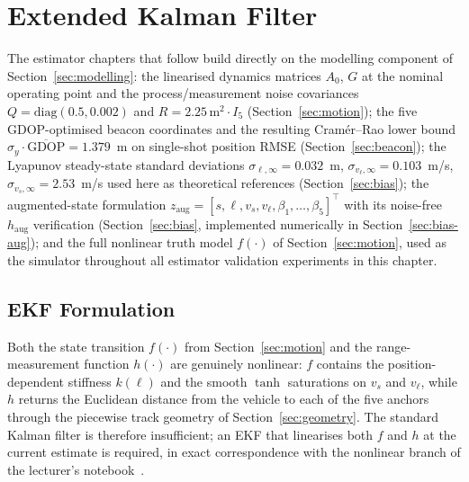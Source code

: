 \documentclass[11pt,a4paper]{article}
\begin{document}
\FloatBarrier
\section{Extended Kalman Filter}
\label{sec:ekf}

The estimator chapters that follow build directly on the modelling
component of Section~\ref{sec:modelling}: the linearised dynamics
matrices $A_0$, $G$ at the nominal operating point and the
process/measurement noise covariances $Q=\mathrm{diag}(0.5, 0.002)$
and $R=2.25\,\mathrm{m}^2 \cdot I_5$ (Section~\ref{sec:motion}); the
five GDOP-optimised beacon coordinates and the resulting
Cram\'er--Rao lower bound
$\sigma_y\cdot\overline{\mathrm{GDOP}}=1.379$~m on single-shot
position RMSE (Section~\ref{sec:beacon}); the Lyapunov steady-state
standard deviations $\sigma_{\ell,\infty}=0.032$~m,
$\sigma_{v_\ell,\infty}=0.103$~m/s, $\sigma_{v_s,\infty}=2.53$~m/s
used here as theoretical references (Section~\ref{sec:bias}); the
augmented-state formulation
$z_\text{aug}=[s,\ell,v_s,v_\ell,\beta_1,\dots,\beta_5]^{\!\top}$ with its
noise-free $h_\text{aug}$ verification (Section~\ref{sec:bias},
implemented numerically in Section~\ref{sec:bias-aug}); and the
full nonlinear truth model $f(\cdot)$ of Section~\ref{sec:motion},
used as the simulator throughout all estimator validation
experiments in this chapter.

\subsection{EKF Formulation}
\label{sec:ekf-formulation}

Both the state transition $f(\cdot)$ from Section~\ref{sec:motion} and
the range-measurement function $h(\cdot)$ are genuinely nonlinear: $f$
contains the position-dependent stiffness $k(\ell)$ and the smooth
$\tanh$ saturations on $v_s$ and $v_\ell$, while $h$ returns the
Euclidean distance from the vehicle to each of the five anchors
through the piecewise track geometry of Section~\ref{sec:geometry}.
The standard Kalman filter is therefore insufficient; an EKF that
linearises both $f$ and $h$ at the current estimate is required, in
exact correspondence with the nonlinear branch of the lecturer's
notebook~\cite{Sopasakis_5_ekf}.
\end{document}
